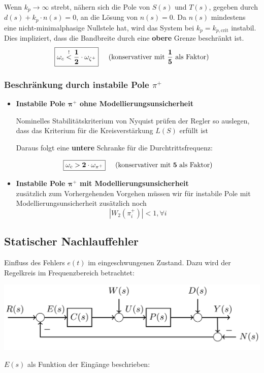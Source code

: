         Wenn $k_p \rightarrow \infty$ strebt, nähern sich die Pole von $S(s)$ und $T(s)$, gegeben durch $d(s)+k_p \cdot n(s) = 0 $, an die Lösung von $n(s) = 0$. Da $n(s)$ mindestens eine nicht-minimalphasige Nullstele hat, wird das System bei $k_p = k_{p,\textrm{crit}}$ instabil. Dies impliziert, dass die Bandbreite durch eine \textbf{obere} Grenze beschränkt ist.
        \[\boxed{\omega_c \overset{!}{<} \mathbf{\frac{1}{2}} \cdot\omega_{\zeta^+}} \hspace{5mm} (\textrm{konservativer mit } \mathbf{\frac{1}{5}}\textrm{ als Faktor})\]
        
        \subsubsection{Beschränkung durch instabile Pole $\pi^+$}
            \begin{itemize}
                \item \textbf{Instabile Pole $\mathbf{\pi^+}$ ohne Modellierungsunsicherheit}

                Nominelles Stabilitätskriterium von Nyquist prüfen der Regler so auslegen, dass das Kriterium für die Kreisverstärkung $L(S)$ erfüllt ist
                
                Daraus folgt eine \textbf{untere} Schranke für die Durchtrittsfrequenz:
                
                \[\boxed{\omega_c>\mathbf{2}\cdot \omega_{\pi^+}}\hspace{5mm} (\textrm{konservativer mit } \mathbf{5}\textrm{ als Faktor})\]
                
                \item \textbf{Instabile Pole $\mathbf{\pi^+}$ mit Modellierungsunsicherheit}\\
                zusätzlich zum Vorhergehenden Vorgehen müssen wir für instabile Pole mit Modellierungsunsicherheit zusätzlich noch \[|W_2(\pi_i^+)| <1, \forall i\]
            \end{itemize}
            
    \subsection{Statischer Nachlauffehler}
        Einfluss des Fehlers $e(t)$ im eingeschwungenen Zustand. Dazu wird der Regelkreis im Frequenzbereich betrachtet:
        \begin{center}
            \includegraphics[width = 0.8\linewidth]{images/08/Standart_Regelkreis_FB.jpg}
        \end{center}
        $E(s)$ als Funktion der Eingänge beschrieben: 
    
